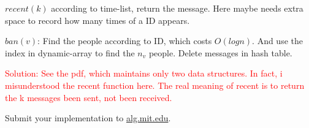\documentclass[12pt,twoside]{article}
\begin{document}
\begin{problems}
\begin{itemize}
    $recent(k)$ according to time-list, return the message. Here maybe needs extra space to 
    record how many times of a ID appears.

    $ban(v)$: Find the people according to ID, which costs $O(logn)$. And use the index in 
    dynamic-array to find the $n_v$ people. Delete messages in hash table. 

\end{itemize}
\textcolor{red}{Solution: See the pdf, which maintains only two data structures. In fact, i
misunderstood the recent function here. The real meaning of recent is to return the k messages 
been sent, not been received.}


\newpage
\problem  %

\begin{problemparts}
\problempart %
\problempart %
\problempart Submit your implementation to {\small\url{alg.mit.edu}}.
\end{problemparts}

\end{problems}
\end{document}

